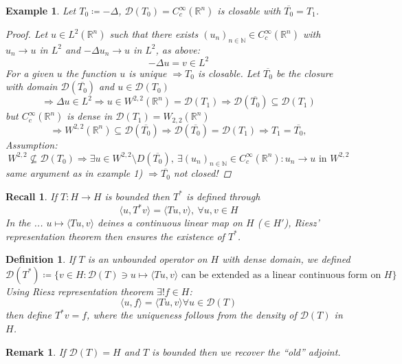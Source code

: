 \documentclass[12pt]{extreport} %
\newcommand{\N}{\mathbb{N}}
\newcommand{\R}{\mathbb{R}}
\newcommand{\DO}[1]{\mathcal{D}\left( {#1} \right)}
\theoremstyle{named}
\theoremstyle{nnamed}
\theoremstyle{itshape}
\newtheorem{definition}{Definition}  \counterwithin{definition}{chapter}
\theoremstyle{normal}
\newtheorem*{recall}{Recall}
\newtheorem*{example}{Example}
\newtheorem*{remark}{Remark}
\begin{document}
\begin{example}
	Let $T_0 \coloneqq - \Delta$, $\DO{T_0} = C_c^\infty(\R^n)$ is closable with $\overline{T_0} = T_1$.
	 
	\begin{proof}
		Let $u \in L^2(\R^n)$ such that there exists $(u_n)_{n \in \N} \in C_c^\infty(\R^n)$ with $u_n \rightarrow u$ in $L^2$ and $-\Delta u_n \rightarrow u$ in $L^2$, as above: 
		$$ -\Delta u = v \in L^2 $$
		For a given $u$ the function $u$ is unique $\Rightarrow T_0$ is closable. Let $\overline{T_0}$ be the closure with domain $\DO{\overline{T_0}}$ and $u \in \DO{T_0}$
		$$ \Rightarrow \Delta u \in L^2 \Rightarrow u \in W^{2,2}(\R^n) = \DO{T_1} \Rightarrow \DO{\overline{T_0}} \subseteq \DO{T_1} $$
		but $C_c^{\infty}(\R^n)$ is dense in $\DO{T_1} = W_{2,2}(\R^n)$
		$$ \Rightarrow W^{2,2}(\R^n) \subseteq \DO{\overline{T_0}} \Rightarrow \DO{\overline{T_0}} = \DO{T_1} \Rightarrow T_1 = \overline{T_0}, $$
		Assumption: 
		$$ W^{2,2} \not\subseteq \DO{T_0} \Rightarrow \exists u \in W^{2, 2} \setminus D \left( \overline{T_0} \right), ~\exists (u_n)_{n \in \N} \in C^{\infty}_c (\R^n): u_n \rightarrow u \text{ in } W^{2, 2}$$ same argument as in example 1) $\Rightarrow \overline{T_0}$ not closed!
	\end{proof}	
\end{example}

\begin{recall}
	If $T \colon H \rightarrow H$ is bounded then $T^*$ is defined through
	$$ \langle u , T^* v \rangle = \langle T u , v \rangle, ~ \forall u, v \in H $$	
	In the ... $u \mapsto \langle T u, v \rangle$ deines a continuous linear map on $H$ ($\in H'$), Riesz' representation theorem then ensures the existence of $T^*$.
\end{recall}

\begin{definition}
	If $T$ is an unbounded operator on $H$ with dense domain, we defined 
		$$ \DO{T^*} \coloneqq \big\{ v \in H \colon \DO{T} \ni u \mapsto \langle T u, v \rangle \text{ can be extended as a linear continuous form on } H \big\} $$
	Using Riesz representation theorem $\exists! f \in H$:
		$$ \langle u, f \rangle = \langle T u, v \rangle \forall u \in \DO{T} $$
	then define $T^* v = f$, where the uniqueness follows from the density of $\DO{T}$ in $H$.
\end{definition}

\begin{remark}
	If $\DO{T} = H$ and $T$ is bounded then we recover the \enquote{old} adjoint.
\end{remark}
\end{document}
